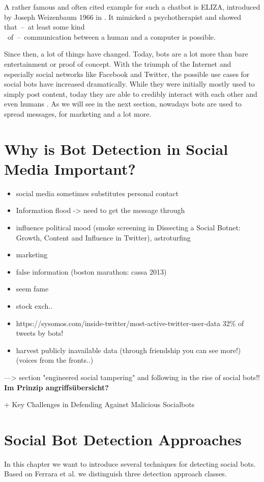 A rather famous and often cited example for such a chatbot is ELIZA, introduced by Joseph Weizenbaum 1966 in \cite{eliza}. It mimicked a psychotherapist and showed \mbox{that -- at} least some kind\\ \mbox{ of -- communication} between a human and a computer is possible.

Since then, a lot of things have changed. Today, bots are a lot more than bare entertainment or proof of concept. With the triumph of the Internet and especially social networks like Facebook and Twitter, the possible use cases for social bots have increased dramatically. While they were initially mostly used to simply post content, today they are able to credibly interact with each other and even humans \cite{boshmaf13, hwang12}. As we will see in the next section, nowadays bots are used to spread messages, for marketing and a lot more.


\section{Why is Bot Detection in Social Media Important?}
\begin{itemize}
	\item social media sometimes substitutes personal contact
	\item Information flood -> need to get the message through
	\item influence political mood (smoke screening in Dissecting a Social Botnet: Growth, Content	and Influence in Twitter), astroturfing
	\item marketing
	\item false information (boston marathon: cassa 2013)
	\item seem fame
	\item stock exch..
	\item https://sysomos.com/inside-twitter/most-active-twitter-user-data 32\% of tweets by bots!
	\item harvest publicly inavailable data (through friendship you can see more!) (voices from the fronts..)
\end{itemize}
---> section "engineered social tampering" and following in the rise of social bots!! 
\textbf{Im Prinzip angriffsübersicht?}

+ Key Challenges in Defending Against Malicious Socialbots \cite{boshmaf12}
\section{Social Bot Detection Approaches}
In this chapter we want to introduce several techniques for detecting social bots. Based on Ferrara et al. \cite{ferrara15} we distinguish three detection approach classes. 

